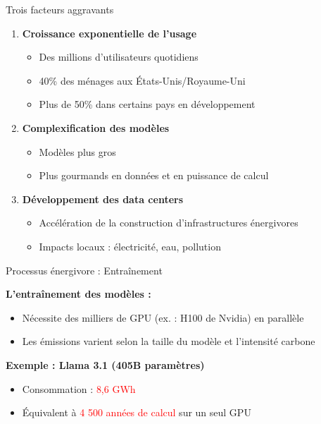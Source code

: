 \begin{frame}{Trois facteurs aggravants}

\begin{enumerate}
    \item<+-> \textbf{Croissance exponentielle de l'usage}
        \begin{itemize}
            \item Des millions d'utilisateurs quotidiens
            \item 40\% des ménages aux États-Unis/Royaume-Uni
            \item Plus de 50\% dans certains pays en développement
        \end{itemize}

    \vspace{0.2cm}
    \item<+-> \textbf{Complexification des modèles}
        \begin{itemize}
            \item Modèles plus gros
            \item Plus gourmands en données et en puissance de calcul
        \end{itemize}

    \vspace{0.2cm}
    \item<+-> \textbf{Développement des data centers}
        \begin{itemize}
            \item Accélération de la construction d'infrastructures énergivores
            \item Impacts locaux : électricité, eau, pollution
        \end{itemize}
\end{enumerate}

\end{frame}

\begin{frame}{Processus énergivore : Entraînement}

\textbf{L'entraînement des modèles :}

\vspace{0.3cm}

\begin{itemize}
    \item Nécessite des milliers de GPU (ex. : H100 de Nvidia) en parallèle
    \item Les émissions varient selon la taille du modèle et l'intensité carbone
\end{itemize}

\vspace{0.5cm}

\textbf{Exemple : Llama 3.1 (405B paramètres)}
\begin{itemize}
    \item Consommation : \textcolor{red}{8,6 GWh}
    \item Équivalent à \textcolor{red}{4 500 années de calcul} sur un seul GPU
\end{itemize}

\end{frame}

